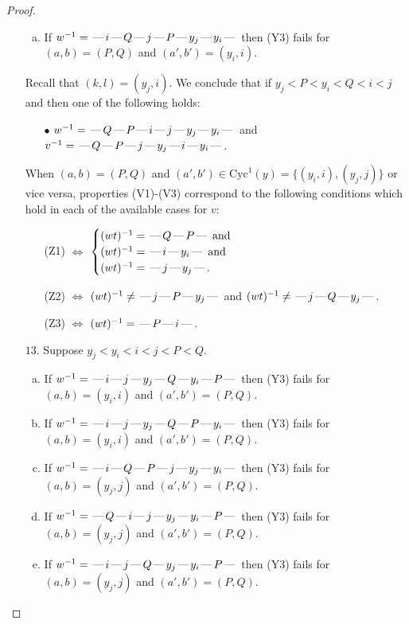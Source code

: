 \documentclass[10pt]{article}
\theoremstyle{definition}
\theoremstyle{definition}
\def\dash{\text{\hspace{0.5mm}---\hspace{0.5mm}}}
\def\Cyc{\mathrm{Cyc}}
\begin{document}
\begin{proof}
\begin{enumerate}
\begin{enumerate}[(a)]
\item If $w^{-1} = \dash i\dash Q\dash j\dash P\dash y_j\dash y_i\dash $ then (Y3) fails for $(a,b)=(P,Q)$ and $(a',b')=(y_i,i)$.
\end{enumerate}
Recall that $(k,l) = (y_j,i)$.
We conclude that if $y_j < P < y_i < Q < i < j$ and then one of the following holds:
\begin{enumerate}
\item[$\bullet$] $w^{-1} = \dash Q\dash P\dash i\dash j\dash y_j\dash y_i\dash $ and $v^{-1} = \dash Q\dash P\dash j\dash y_j\dash i\dash y_i\dash $.
\end{enumerate}
When $(a,b)= (P,Q)$ and $(a',b')\in \Cyc^1(y)=\{(y_i,i),(y_j,j)\}$ or vice versa,
properties (V1)-(V3) correspond to the following conditions which hold in
each of the available cases for $v$:
\begin{enumerate}
\item[](Z1) $\Leftrightarrow$ $\begin{cases}\text{$(wt)^{-1} = \dash Q \dash P \dash$}\text{ and }\\
\text{$(wt)^{-1} = \dash i \dash y_i \dash$}\text{ and }\\
\text{$(wt)^{-1} = \dash j \dash y_j \dash$}.\end{cases}$
\item[](Z2) $\Leftrightarrow$ $(wt)^{-1} \neq \dash j \dash P \dash y_j \dash$ and $(wt)^{-1}\neq \dash j \dash Q \dash y_j \dash$.
\item[](Z3) $\Leftrightarrow$ $(wt)^{-1} = \dash P \dash i \dash$.
\end{enumerate}
\item[$13$.] Suppose $y_j < y_i < i < j < P < Q$.
\begin{enumerate}[(a)]
\item If $w^{-1} = \dash i\dash j\dash y_j\dash Q\dash y_i\dash P\dash $ then (Y3) fails for $(a,b)=(y_i,i)$ and $(a',b')=(P,Q)$.
\item If $w^{-1} = \dash i\dash j\dash y_j\dash Q\dash P\dash y_i\dash $ then (Y3) fails for $(a,b)=(y_i,i)$ and $(a',b')=(P,Q)$.
\item If $w^{-1} = \dash i\dash Q\dash P\dash j\dash y_j\dash y_i\dash $ then (Y3) fails for $(a,b)=(y_j,j)$ and $(a',b')=(P,Q)$.
\item If $w^{-1} = \dash Q\dash i\dash j\dash y_j\dash y_i\dash P\dash $ then (Y3) fails for $(a,b)=(y_j,j)$ and $(a',b')=(P,Q)$.
\item If $w^{-1} = \dash i\dash j\dash Q\dash y_j\dash y_i\dash P\dash $ then (Y3) fails for $(a,b)=(y_j,j)$ and $(a',b')=(P,Q)$.

\end{enumerate}
\end{enumerate}
\end{proof}
\end{document}
